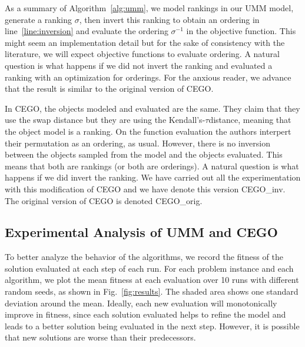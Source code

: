 \documentclass[sigconf,dvipsnames]{acmart}
\newcommand{\ken}{Kendall's-$\tau$}
\begin{document}
As a summary of Algorithm~\ref{alg:umm}, we model rankings in our UMM model, generate a ranking $\sigma$, then invert this ranking to obtain an ordering in line~\ref{line:inversion} and evaluate the ordering $\sigma^{-1}$ in the objective function. This might seem an implementation detail but for the sake of consistency with the literature, we will expect objective functions to evaluate ordering. A natural question is what happens if we did not invert the ranking and evaluated a ranking with an optimization for orderings. For the anxious reader, we advance that the result is similar to the original version of CEGO. 

In CEGO, the objects modeled and evaluated are the same. They claim that they use the swap distance but they are using the \ken  distance, meaning that the object model is a ranking. 
On the function evaluation the authors interpert their permutation as an ordering, as usual. 
However, there is no inversion between the objects sampled from the model and the objects evaluated. 
This means that both are rankings (or both are orderings). A natural question is what happens if we did invert the ranking. We have carried out all the experimentation with this modification of CEGO and we have denote this version CEGO\_inv. The original version of CEGO is denoted CEGO\_orig. 






\subsection{Experimental Analysis of UMM and CEGO} %

To better analyze the behavior of the algorithms, we record the fitness of the
solution evaluated at each step of each run. For each problem instance and each
algorithm, we plot the mean fitness at each evaluation over 10 runs with
different random seeds, as shown in Fig.~\ref{fig:results}.
%
The shaded area shows one standard deviation around the mean. Ideally, each new
evaluation will monotonically improve in fitness, since each solution evaluated
helps to refine the model and leads to a better solution being evaluated in the
next step.  However, it is possible that new solutions are worse than their
predecessors. %
\end{document}
